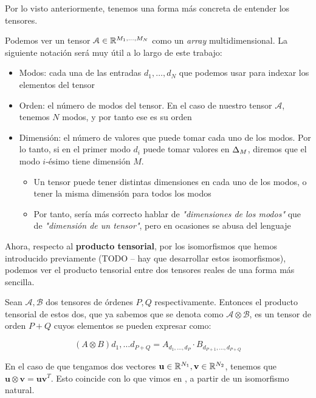 Por lo visto anteriormente, tenemos una forma más concreta de entender los tensores.

Podemos ver un tensor $\mathcal{A} \in \mathbb{R}^{M_1, \ldots, M_N}$ como un \textit{array} multidimensional. La siguiente notación será muy útil a lo largo de este trabajo:

\begin{itemize}
    \item Modos: cada una de las entradas $d_1, \ldots, d_N$ que podemos usar para indexar los elementos del tensor
    \item Orden: el número de modos del tensor. En el caso de nuestro tensor $\mathcal{A}$, tenemos $N$ modos, y por tanto ese es su orden
    \item Dimensión: el número de valores que puede tomar cada uno de los modos. Por lo tanto, si en el primer modo $d_i$ puede tomar valores en $\Delta_{M}$, diremos que el modo $i$-ésimo tiene dimensión $M$.
        \begin{itemize}
            \item Un tensor puede tener distintas dimensiones en cada uno de los modos, o tener la misma dimensión para todos los modos
            \item Por tanto, sería más correcto hablar de \textit{"dimensiones de los modos"} que de \textit{"dimensión de un tensor"}, pero en ocasiones se abusa del lenguaje
        \end{itemize}
\end{itemize}

Ahora, respecto al \textbf{producto tensorial}, por los isomorfismos que hemos introducido previamente (TODO -- hay que desarrollar estos isomorfismos), podemos ver el producto tensorial entre dos tensores reales de una forma más sencilla.

Sean $\mathcal{A}, \mathcal{B}$ dos tensores de órdenes $P, Q$ respectivamente. Entonces el producto tensorial de estos dos, que ya sabemos que se denota como $\mathcal{A} \otimes \mathcal{B}$, es un tensor de orden $P + Q$ cuyos elementos se pueden expresar como:

$$(A \otimes B)d_1, \ldots d_{P + Q} = A_{d_1, \ldots, d_P} \cdot B_{d_{P + 1}, \ldots, d_{P + Q}}$$

En el caso de que tengamos dos vectores $\mathbf{u} \in \mathbb{R}^{N_1}, \mathbf{v} \in \mathbb{R}^{N_2}$, tenemos que $\mathbf{u} \otimes \mathbf{v} = \mathbf{u} \mathbf{v}^T$. Esto coincide con lo que vimos en , a partir de un isomorfismo natural.

